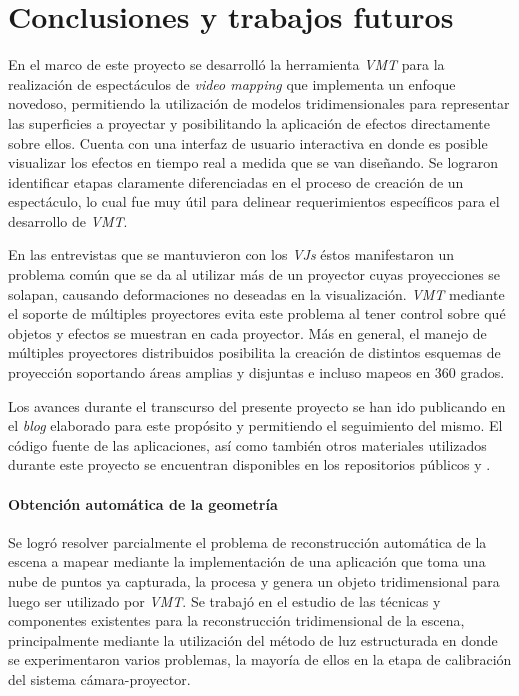 ﻿\chapter{Conclusiones y trabajos futuros}

En el marco de este proyecto se desarrolló la herramienta \emph{VMT} para la realización de espectáculos de \emph{video mapping} que implementa un enfoque novedoso, permitiendo la utilización de modelos tridimensionales para representar las superficies a proyectar y posibilitando la aplicación de efectos directamente sobre ellos. Cuenta con una interfaz de usuario interactiva en donde es posible visualizar los efectos en tiempo real a medida que se van diseñando.
Se lograron identificar etapas claramente diferenciadas en el proceso de creación de un espectáculo, lo cual fue muy útil para delinear requerimientos específicos para el desarrollo de \emph{VMT}. 

En las entrevistas que se mantuvieron con los \emph{VJs} éstos manifestaron un problema común que se da al utilizar más de un proyector cuyas proyecciones se solapan, causando deformaciones no deseadas en la visualización. \emph{VMT} mediante el soporte de múltiples proyectores evita este problema al tener control sobre qué objetos y efectos se muestran en cada proyector. Más en general, el manejo de múltiples proyectores distribuidos posibilita la creación de distintos esquemas de proyección soportando áreas amplias y disjuntas e incluso mapeos en 360 grados.

Los avances durante el transcurso del presente proyecto se han ido publicando en el \emph{blog}\cite{BLOG} elaborado para este propósito y permitiendo el seguimiento del mismo.
El código fuente de las aplicaciones, así como también otros materiales utilizados durante este proyecto se encuentran disponibles en los repositorios públicos \cite{SOURCEGOOGLE} y \cite{SOURCEGITHUB}.

\subsubsection{Obtención automática de la geometría}

Se logró resolver parcialmente el problema de reconstrucción automática de la escena a mapear mediante la implementación de una aplicación que toma una nube de puntos ya capturada, la procesa y genera un objeto tridimensional para luego ser utilizado por \emph{VMT}.
Se trabajó en el estudio de las técnicas y componentes existentes para la reconstrucción tridimensional de la escena, principalmente mediante la utilización del método de luz estructurada en donde se experimentaron varios problemas, la mayoría de ellos en la etapa de calibración del sistema cámara-proyector. 

